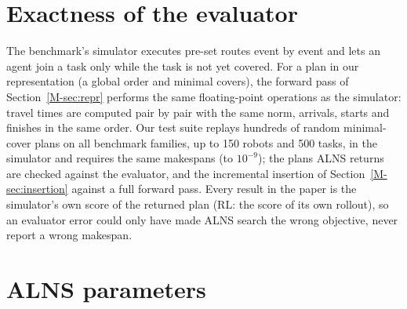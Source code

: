 \documentclass[10pt]{article}
\begin{document}
\section{Exactness of the evaluator}
\label{sec:s-exact}

The benchmark's simulator executes pre-set routes event by event and lets an agent join a task only while the task is
not yet covered. For a plan in our representation (a global order and minimal covers), the forward pass of
Section~\ref{M-sec:repr} performs the same floating-point operations as the simulator: travel times are computed pair by
pair with the same norm, arrivals, starts and finishes in the same order. Our test suite replays hundreds of random
minimal-cover plans on all benchmark families, up to 150 robots and 500 tasks, in the simulator and requires the same
makespans (to $10^{-9}$); the plans ALNS returns are checked against the evaluator, and the incremental insertion of
Section~\ref{M-sec:insertion} against a full forward pass. Every result in the paper is the simulator's own score of the returned plan
(RL: the score of its own rollout), so an evaluator error could only have made ALNS search the wrong objective, never
report a wrong makespan.

\section{ALNS parameters}
\label{sec:s-params}
\end{document}

